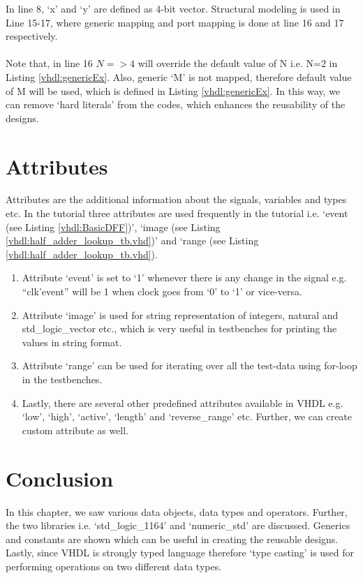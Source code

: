 \begin{explanation}
	In line 8, `x' and `y' are defined as 4-bit vector. Structural modeling is used in Line 15-17, where generic mapping and port mapping is done at line 16 and 17 respectively. 
	\\ \\
	Note that, in line 16 $N=>4$ will override the default value of N i.e. N=2 in Listing \ref{vhdl:genericEx}. Also, generic `M' is not mapped, therefore default value of M will be used, which is defined in Listing \ref{vhdl:genericEx}. In this way, we can remove `hard literals' from the codes, which enhances the reusability of the designs. 
\end{explanation}


\section{Attributes} 
Attributes are the additional information about the signals, variables and types etc. In the tutorial three attributes are used frequently in the tutorial i.e. `event (see Listing \ref{vhdl:BasicDFF})', `image (see Listing \ref{vhdl:half_adder_lookup_tb.vhd})' and `range (see Listing \ref{vhdl:half_adder_lookup_tb.vhd}). 

\begin{enumerate}
	\item Attribute `event' is set to `1' whenever there is any change in the signal e.g. ``clk'event'' will be 1 when clock goes from `0' to `1' or vice-versa.
	\item Attribute `image' is used for string representation of integers, natural and std\_logic\_vector etc., which is very useful in testbenches for printing the values in string format.
	\item Attribute `range' can be used for iterating over all the test-data using for-loop in the testbenches.
	\item Lastly, there are several other predefined attributes available in VHDL e.g. `low', `high', `active', `length' and `reverse\_range' etc. Further, we can create custom attribute as well.
\end{enumerate}

 

\section{Conclusion}
In this chapter, we saw various data objects, data types and operators. Further, the two libraries i.e. `std\_logic\_1164' and `numeric\_std' are discussed. Generics and constants are shown which can be useful in creating the reusable designs. Lastly, since VHDL is strongly typed language therefore `type casting' is used for performing operations on two different data types. 